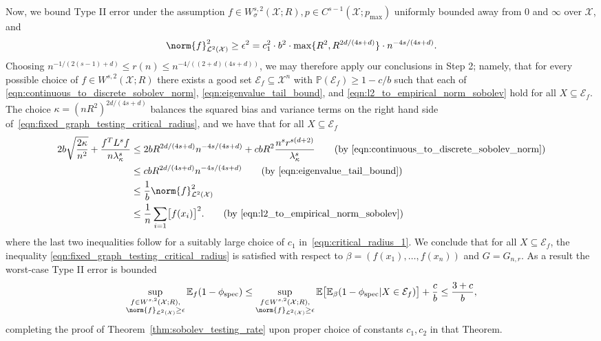 \documentclass{article}
\newcommand{\1}{\mathbf{1}}
\newcommand{\Xset}{\mathcal{X}}
\newcommand{\Leb}{\mathcal{L}}
\newcommand{\Pbb}{\mathbb{P}}
\newcommand{\spec}{\mathrm{spec}}
\theoremstyle{alden}
\theoremstyle{aldenthm}
\theoremstyle{definition}
\theoremstyle{remark}
\begin{document}
Now, we bound Type II error under the assumption $f \in W_{\sigma}^{s,2}(\mathcal{X};R), p \in C^{s - 1}(\Xset;p_{\max})$ uniformly bounded away from $0$ and $\infty$ over $\Xset$, and 
\begin{equation}
\label{eqn:critical_radius_1}
\norm{f}_{\Leb^2(\Xset)}^2 \geq \epsilon^2 = c_1^2 \cdot b^2 \cdot \max\{R^2,R^{2d/(4s + d)}\} \cdot n^{-4s/(4s + d)}.
\end{equation}
Choosing $n^{-1/(2(s - 1) + d)}\leq r(n) \leq n^{-4/((2+d)(4s + d))}$, we may therefore apply our conclusions in Step 2; namely, that for every possible choice of $f \in W^{s,2}(\Xset;R)$ there exists a good set $\mathcal{E}_f \subseteq \Xset^n$ with $\Pbb(\mathcal{E}_f) \geq 1 - c/b$ such that each of \eqref{eqn:continuous_to_discrete_sobolev_norm}, \eqref{eqn:eigenvalue_tail_bound}, and \eqref{eqn:l2_to_empirical_norm_sobolev} hold for all $X \subseteq \mathcal{E}_f$. The choice $\kappa = (nR^2)^{2d/(4s + d)}$ balances the squared bias and variance terms on the right hand side of~\eqref{eqn:fixed_graph_testing_critical_radius}, and we have that for all $X \subseteq \mathcal{E}_f$
\begin{align*}
2b\sqrt{\frac{2\kappa}{n^2}} + \frac{f^T L^s f}{n\lambda_{\kappa}^s} & \leq 2bR^{2d/(4s + d)}n^{-4s/(4s+d)} + cbR^2\frac{n^{s} r^{s(d + 2)}}{\lambda_{\kappa}^s} \tag{by \eqref{eqn:continuous_to_discrete_sobolev_norm}} \\
& \leq cbR^{2d/(4s + d)}n^{-4s/(4s+d)} \tag{by \eqref{eqn:eigenvalue_tail_bound}} \\
& \leq \frac{1}{b}\norm{f}_{\Leb^2(\Xset)}^2 \\
& \leq \frac{1}{n}\sum_{i = 1} \bigl[f(x_i)\bigr]^2. \tag{by \eqref{eqn:l2_to_empirical_norm_sobolev}}
\end{align*}
where the last two inequalities follow for a suitably large choice of $c_1$ in~\eqref{eqn:critical_radius_1}.
We conclude that for all $X \subseteq \mathcal{E}_f$, the inequality \eqref{eqn:fixed_graph_testing_critical_radius} is satisfied with respect to $\beta = (f(x_1),\ldots,f(x_n))$ and $G = G_{n,r}$. As a result the worst-case Type II error is bounded
\begin{equation*}
\sup_{\substack{f \in W^{s,2}(\Xset;R), \\ \norm{f}_{\Leb^2(\Xset)} \geq \epsilon}}\mathbb{E}_{f}(1 - \phi_{\spec}) \leq \sup_{\substack{f \in W^{s,2}(\Xset;R), \\ \norm{f}_{\Leb^2(\Xset)} \geq \epsilon}} \mathbb{E}\bigl[\mathbb{E}_{\beta}(1 - \phi_{\spec}|X \in \mathcal{E}_f)\bigr] + \frac{c}{b} \leq \frac{3 + c}{b},
\end{equation*}
completing the proof of Theorem~\ref{thm:sobolev_testing_rate} upon proper choice of constants $c_1,c_2$ in that Theorem.
\end{document}
